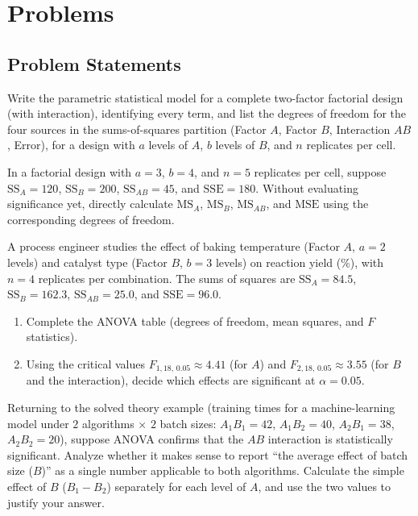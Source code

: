 \section*{Problems}

\subsection*{Problem Statements}

\begin{problema}
\label{prob:11b9df2}
Write the parametric statistical model for a complete two-factor factorial design (with interaction), identifying every term, and list the degrees of freedom for the four sources in the sums-of-squares partition (Factor $A$, Factor $B$, Interaction $AB$, Error), for a design with $a$ levels of $A$, $b$ levels of $B$, and $n$ replicates per cell.
\end{problema}

\begin{problema}
\label{prob:196fe5a}
In a factorial design with $a=3$, $b=4$, and $n=5$ replicates per cell, suppose $\text{SS}_A=120$, $\text{SS}_B=200$, $\text{SS}_{AB}=45$, and $\text{SSE}=180$. Without evaluating significance yet, directly calculate $\text{MS}_A$, $\text{MS}_B$, $\text{MS}_{AB}$, and $\text{MSE}$ using the corresponding degrees of freedom.
\end{problema}

\begin{problema}
\label{prob:414074b}
A process engineer studies the effect of baking temperature (Factor $A$, $a=2$ levels) and catalyst type (Factor $B$, $b=3$ levels) on reaction yield (\%), with $n=4$ replicates per combination. The sums of squares are $\text{SS}_A=84.5$, $\text{SS}_B=162.3$, $\text{SS}_{AB}=25.0$, and $\text{SSE}=96.0$.
\begin{enumerate}
\item Complete the ANOVA table (degrees of freedom, mean squares, and $F$ statistics).
\item Using the critical values $F_{1,18,\,0.05}\approx4.41$ (for $A$) and $F_{2,18,\,0.05}\approx3.55$ (for $B$ and the interaction), decide which effects are significant at $\alpha=0.05$.
\end{enumerate}
\end{problema}

\begin{problema}
\label{prob:64cf64c}
Returning to the solved theory example (training times for a machine-learning model under $2$ algorithms $\times$ $2$ batch sizes: $A_1B_1=42$, $A_1B_2=40$, $A_2B_1=38$, $A_2B_2=20$), suppose ANOVA confirms that the $AB$ interaction is statistically significant. Analyze whether it makes sense to report ``the average effect of batch size ($B$)'' as a single number applicable to both algorithms. Calculate the simple effect of $B$ ($B_1-B_2$) separately for each level of $A$, and use the two values to justify your answer.
\end{problema}

